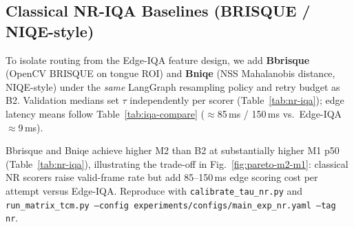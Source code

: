 \subsection{Classical NR-IQA Baselines (BRISQUE / NIQE-style)}
\label{sec:nr-iqa-baselines}

To isolate routing from the Edge-IQA feature design, we add \textbf{Bbrisque} (OpenCV BRISQUE on tongue ROI) and \textbf{Bniqe} (NSS Mahalanobis distance, NIQE-style) under the \emph{same} LangGraph resampling policy and retry budget as B2.
Validation medians set $\tau$ independently per scorer (Table~\ref{tab:nr-iqa}); edge latency means follow Table~\ref{tab:iqa-compare} ($\approx$85\,ms / 150\,ms vs.\ Edge-IQA $\approx$9\,ms).



Bbrisque and Bniqe achieve higher M2 than B2 at substantially higher M1 p50 (Table~\ref{tab:nr-iqa}), illustrating the trade-off in Fig.~\ref{fig:pareto-m2-m1}: classical NR scorers raise valid-frame rate but add 85--150\,ms edge scoring cost per attempt versus Edge-IQA.
Reproduce with \texttt{calibrate\_tau\_nr.py} and \texttt{run\_matrix\_tcm.py --config experiments/configs/main\_exp\_nr.yaml --tag nr}.
